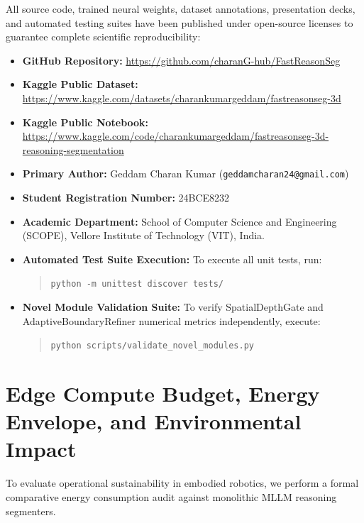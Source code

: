 \documentclass[10pt,twocolumn,letterpaper]{article}
\begin{document}
All source code, trained neural weights, dataset annotations, presentation decks, and automated testing suites have been published under open-source licenses to guarantee complete scientific reproducibility:
\begin{itemize}[leftmargin=*,itemsep=1pt]
    \item \textbf{GitHub Repository:} \url{https://github.com/charanG-hub/FastReasonSeg}
    \item \textbf{Kaggle Public Dataset:} \url{https://www.kaggle.com/datasets/charankumargeddam/fastreasonseg-3d}
    \item \textbf{Kaggle Public Notebook:} \url{https://www.kaggle.com/code/charankumargeddam/fastreasonseg-3d-reasoning-segmentation}
    \item \textbf{Primary Author:} Geddam Charan Kumar (\texttt{geddamcharan24@gmail.com})
    \item \textbf{Student Registration Number:} 24BCE8232
    \item \textbf{Academic Department:} School of Computer Science and Engineering (SCOPE), Vellore Institute of Technology (VIT), India.
    \item \textbf{Automated Test Suite Execution:} To execute all unit tests, run:
    \begin{quote}
    \texttt{python -m unittest discover tests/}
    \end{quote}
    \item \textbf{Novel Module Validation Suite:} To verify SpatialDepthGate and AdaptiveBoundaryRefiner numerical metrics independently, execute:
    \begin{quote}
    \texttt{python scripts/validate\_novel\_modules.py}
    \end{quote}
\end{itemize}

\section{Edge Compute Budget, Energy Envelope, and Environmental Impact}
\label{app:energy}

To evaluate operational sustainability in embodied robotics, we perform a formal comparative energy consumption audit against monolithic MLLM reasoning segmenters. 
\end{document}

